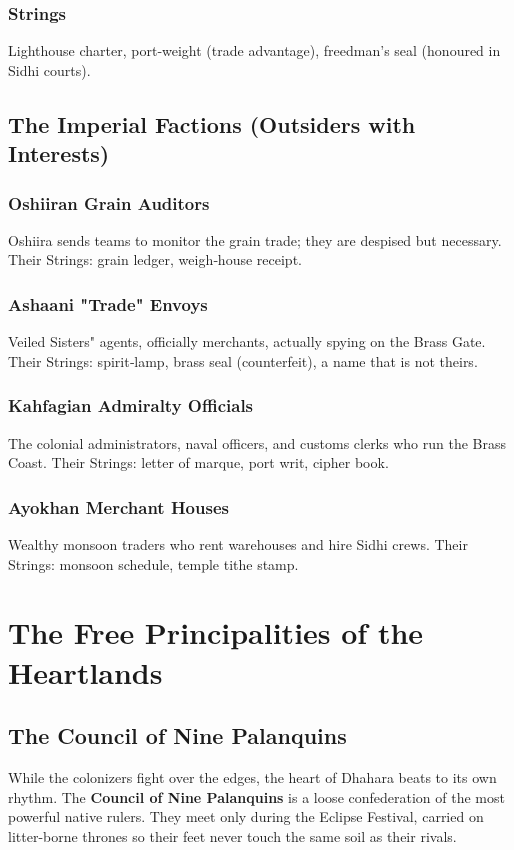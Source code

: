 \documentclass[11pt]{book}
\begin{document}
\subsection*{Strings}
Lighthouse charter, port‑weight (trade advantage), freedman's seal (honoured in Sidhi courts).

\section{The Imperial Factions (Outsiders with Interests)}

\subsection*{Oshiiran Grain Auditors}
Oshiira sends teams to monitor the grain trade; they are despised but necessary. Their Strings: grain ledger, weigh‑house receipt.

\subsection*{Ashaani "Trade" Envoys}
Veiled Sisters" agents, officially merchants, actually spying on the Brass Gate. Their Strings: spirit‑lamp, brass seal (counterfeit), a name that is not theirs.

\subsection*{Kahfagian Admiralty Officials}
The colonial administrators, naval officers, and customs clerks who run the Brass Coast. Their Strings: letter of marque, port writ, cipher book.

\subsection*{Ayokhan Merchant Houses}
Wealthy monsoon traders who rent warehouses and hire Sidhi crews. Their Strings: monsoon schedule, temple tithe stamp.

\clearpage
\chapter{The Free Principalities of the Heartlands}

\section{The Council of Nine Palanquins}
While the colonizers fight over the edges, the heart of Dhahara beats to its own rhythm. The \textbf{Council of Nine Palanquins} is a loose confederation of the most powerful native rulers. They meet only during the Eclipse Festival, carried on litter-borne thrones so their feet never touch the same soil as their rivals.
\end{document}
